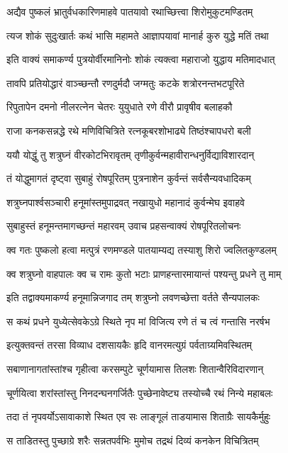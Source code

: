 \twolineshloka
{अद्यैव पुष्कलं भ्रातुर्वधकारिणमाहवे}
{पातयावो रथाच्छित्त्वा शिरोमुकुटमण्डितम्}%

\twolineshloka
{त्यज शोकं सुदुःखार्तः कथं भासि महामते}
{आज्ञापयावां मानार्ह कुरु युद्धे मतिं तथा}%

\twolineshloka
{इति वाक्यं समाकर्ण्य पुत्रयोर्वीरमानिनोः}
{शोकं त्यक्त्वा महाराजो युद्धाय मतिमादधात्}%

\twolineshloka
{तावपि प्रतियोद्धारं वाञ्च्छन्तौ रणदुर्मदौ}
{जग्मतुः कटके शत्रोरनन्तभटपूरिते}%

\twolineshloka
{रिपुतापेन दमनो नीलरत्नेन चेतरः}
{युयुधाते रणे वीरौ प्रावृषीव बलाहकौ}%

\twolineshloka
{राजा कनकसन्नद्धे रथे मणिविचित्रिते}
{रत्नकूबरशोभाढ्ये तिष्ठंश्चापधरो बली}%

\twolineshloka
{ययौ योद्धुं तु शत्रुघ्नं वीरकोटभिरावृतम्}
{तृणीकुर्वन्महावीरान्धनुर्विद्याविशारदान्}%

\twolineshloka
{तं योद्धुमागतं दृष्ट्वा सुबाहुं रोषपूरितम्}
{पुत्रनाशेन कुर्वन्तं सर्वसैन्यवधादिकम्}%

\twolineshloka
{शत्रुघ्नपार्श्वसञ्चारी हनूमांस्तमुपाद्रवत्}
{नखायुधो महानादं कुर्वन्मेघ इवाहवे}%

\twolineshloka
{सुबाहुस्तं हनूमन्तमागच्छन्तं महारवम्}
{उवाच प्रहसन्वाक्यं रोषपूरितलोचनः}%

\twolineshloka
{क्व गतः पुष्कलो हत्वा मत्पुत्रं रणमण्डले}
{पातयाम्यद्य तस्याशु शिरो ज्वलितकुण्डलम्}%

\twolineshloka
{क्व शत्रुघ्नो वाहपालः क्व च रामः कुतो भटाः}
{प्राणहन्तारमायान्तं पश्यन्तु प्रधने तु माम्}%

\twolineshloka
{इति तद्वाक्यमाकर्ण्य हनूमान्निजगाद तम्}
{शत्रुघ्नो लवणच्छेत्ता वर्तते सैन्यपालकः}%

\twolineshloka
{स कथं प्रधने युध्येत्सेवकेऽग्रे स्थिते नृप}
{मां विजित्य रणे तं च त्वं गन्तासि नरर्षभ}%

\twolineshloka
{इत्युक्तवन्तं तरसा विव्याध दशसायकैः}
{हृदि वानरमत्युग्रं पर्वताग्र्यमिवस्थितम्}%

\twolineshloka
{सबाणानागतांस्तांश्च गृहीत्वा करसम्पुटे}
{चूर्णयामास तिलशः शितान्वैरिविदारणान्}%

\twolineshloka
{चूर्णयित्वा शरांस्तांस्तु निनदन्घनगर्जितैः}
{पुच्छेनावेष्ट्य तस्योच्चै रथं निन्ये महाबलः}%

\twolineshloka
{तदा तं नृपवर्योऽसावाकाशे स्थित एव सः}
{लाङ्गूलं ताडयामास शिताग्रैः सायकैर्मुहुः}%

\twolineshloka
{स ताडितस्तु पुच्छाग्रे शरैः सन्नतपर्वभिः}
{मुमोच तद्रथं दिव्यं कनकेन विचित्रितम्}%

